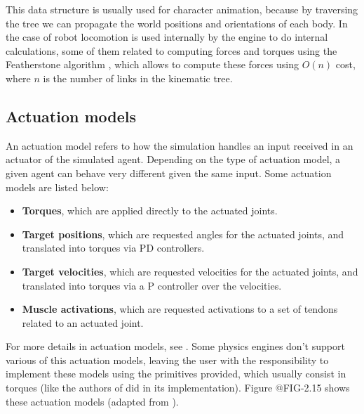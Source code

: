 This data structure is usually used for character animation, because by traversing 
the tree we can propagate the world positions and orientations of each body. In the
case of robot locomotion is used internally by the engine to do internal calculations,
some of them related to computing forces and torques using the Featherstone algorithm \citep{Featherstone},
which allows to compute these forces using $O(n)$ cost, where $n$ is the number of
links in the kinematic tree.

\figKinTreeRepresentation

\subsection{Actuation models}

An actuation model refers to how the simulation handles an input received in an actuator
of the simulated agent. Depending on the type of actuation model, a given agent
can behave very different given the same input. Some actuation models are listed below:

\begin{itemize}
    \item \textbf{Torques}, which are applied directly to the actuated joints.
    \item \textbf{Target positions}, which are requested angles for the actuated joints,
          and translated into torques via PD controllers.
    \item \textbf{Target velocities}, which are requested velocities for the actuated joints,
          and translated into torques via a P controller over the velocities.
    \item \textbf{Muscle activations}, which are requested activations to a set of tendons
          related to an actuated joint.
\end{itemize}

For more details in actuation models, see \cite{ActuationChoice}. Some physics engines don't support 
various of this actuation models, leaving the user with the responsibility to implement
these models using the primitives provided, which usually consist in torques (like the authors
of \citep{DeepmindEmergenceLocomotion} did in its implementation). Figure @FIG-2.15 shows these actuation models 
(adapted from \cite{ActuationChoice}).

\figActuationModels

